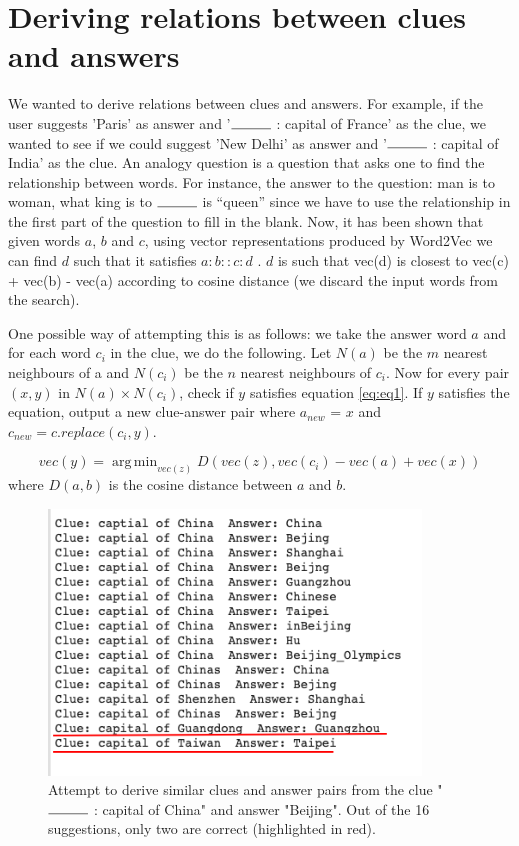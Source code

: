 \documentclass[twoside]{article}
\DeclareMathOperator*{\argmin}{arg\,min}
\begin{document}
\section{Deriving relations between clues and answers}
\label{sec:sec5}
We wanted to derive relations between clues and answers. For example, if the user suggests 'Paris' as answer and '$\rule{1cm}{0.15mm}$ : capital of France' as the clue, we wanted to see if we could suggest 'New Delhi' as answer and '$\rule{1cm}{0.15mm}$ : capital of India' as the clue. An analogy question is a question that asks one to find the relationship between words. For instance, the answer to the question: man is to woman, what king is to $\rule{1cm}{0.15mm}$ is “queen” since we have to use the relationship in the first part of the question to fill in the blank. Now, it has been shown that given words $a$, $b$ and $c$, using vector representations produced by Word2Vec we can find $d$ such that it satisfies $a:b::c:d$ \cite{cite16}. $d$ is such that vec(d) is closest to vec(c) + vec(b) - vec(a) according to cosine distance (we discard the input words from the search).

One possible way of attempting this is as follows: we take the answer word $a$ and for each word $c_i$ in the clue, we do the following. Let $N(a)$ be the $m$ nearest neighbours of a and $N(c_i)$ be the $n$ nearest neighbours of $c_i$. Now for every pair $(x, y)$ in $N(a) \times N(c_i)$, check if $y$ satisfies equation \ref{eq:eq1}. If $y$ satisfies the equation, output a new clue-answer pair where $a_{new}$ = $x$ and $c_{new} = c.replace(c_i, y)$. 

\begin{equation}
\label{eq:eq1}
vec(y) = \argmin_{vec(z)}{D(vec(z), vec(c_i) - vec(a) + vec(x))}
\end{equation}
where $D(a,b)$ is the cosine distance between $a$ and $b$.


\begin{figure}
  \centering
  \includegraphics[height=200pt]{images/analogies.png}
  \caption{Attempt to derive similar clues and answer pairs from the clue "$\rule{1cm}{0.15mm}$ : capital of China" and answer "Beijing". Out of the 16 suggestions, only two are correct (highlighted in red).}
  \label{fig:fig4}
\end{figure}
\end{document}
